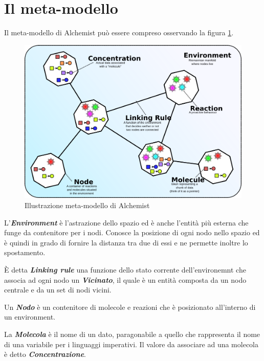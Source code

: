 \documentclass[12pt,a4paper,openright,twoside]{report}
\begin{document}
\section{Il meta-modello}\label{MetaModelloAlchemist}
Il meta-modello di Alchemist pu\`o essere compreso osservando la figura \ref{fig:alchemistModel}.
\begin{figure}[h] %
\begin{center} %
\includegraphics[width=12.5cm]{images/model.png} %
\caption[Illustrazione meta-modello di Alchemist]{Illustrazione meta-modello di Alchemist} \label{fig:alchemistModel}
\end{center}
\end{figure}

L'\textbf{\textit{Environment}} \`e l'astrazione dello spazio ed \`e anche l'entit\`a pi\`u esterna che funge da contenitore per i nodi. Conosce la posizione di ogni nodo nello spazio ed \`e quindi in grado di fornire la distanza tra due di essi e ne permette inoltre lo spostamento.

\`E detta \textbf{\textit{Linking rule}} una funzione dello stato corrente dell'environemnt che associa ad ogni nodo un \textbf{\textit{Vicinato}}, il quale \`e un entit\`a composta da un nodo centrale e da un set di nodi vicini.

Un \textbf{\textit{Nodo}} \`e un contenitore di molecole e reazioni che \`e posizionato all'interno di un environment.

La \textbf{\textit{Molecola}} \`e il nome di un dato, paragonabile a quello che rappresenta il nome di una variabile per i linguaggi imperativi.
Il valore da associare ad una molecola \`e detto \textbf{\textit{Concentrazione}}.
\end{document}
